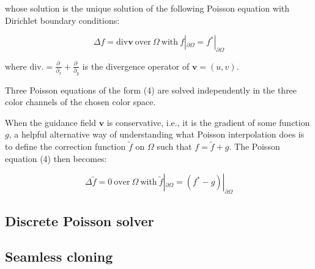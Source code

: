 \documentclass{article}
\begin{document}
whose solution is the unique solution of the following Poisson equation with Dirichlet boundary conditions:

\begin{equation}
    \Delta f = \text{div}\mathbf{v} \ \text{over} \ \Omega \ \text{with} \ f|_{\partial \Omega} = f^*|_{\partial \Omega}
\end{equation}

where $\text{div} . = \frac{\partial_.}{\partial_x} + \frac{\partial_.}{\partial_y}$ is the divergence operator of $\mathbf{v} = (u, v)$. 

Three Poisson equations of the form (4) are solved independently in the three color channels of the chosen color space.


When the guidance field $\mathbf{v}$ is conservative, i.e., it is the gradient of some function $g$, a helpful alternative way of understanding what Poisson interpolation does is to define the correction function $\tilde{f}$ on $\Omega$ such that $f = \tilde{f} + g$. The Poisson equation (4) then becomes:

\begin{equation}
    \Delta \tilde{f} = 0 \ \text{over} \ \Omega \ \text{with} \ \tilde{f}|_{\partial \Omega} = (f^* - g) |_ {\partial \Omega}
\end{equation}

\subsection*{Discrete Poisson solver}

\subsection*{Seamless cloning}
\end{document}
